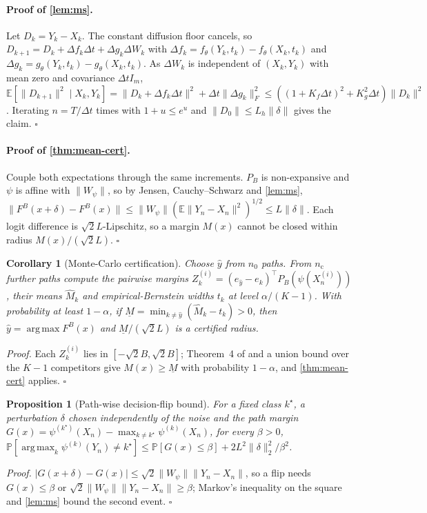 \documentclass{article}
\newtheorem{proposition}{Proposition}
\newtheorem{corollary}{Corollary}
\theoremstyle{definition}
\newcommand{\Exp}{\mathbb{E}}
\newcommand{\Prob}{\mathbb{P}}
\newcommand{\tr}{\top}
\DeclareMathOperator*{\argmax}{arg\,max}
\begin{document}
\paragraph{Proof of \cref{lem:ms}.} Let $D_k=Y_k-X_k$. The constant diffusion
floor cancels, so $D_{k+1}=D_k+\Delta f_k\Delta t+\Delta g_k\Delta W_k$ with
$\Delta f_k=f_\theta(Y_k,t_k)-f_\theta(X_k,t_k)$ and
$\Delta g_k=g_\theta(Y_k,t_k)-g_\theta(X_k,t_k)$. As $\Delta W_k$ is independent
of $(X_k,Y_k)$ with mean zero and covariance $\Delta t I_m$,
$\Exp[\|D_{k+1}\|^2\mid X_k,Y_k]=\|D_k+\Delta f_k\Delta t\|^2+\Delta t\|\Delta g_k\|_F^2
\le((1+K_f\Delta t)^2+K_g^2\Delta t)\|D_k\|^2$. Iterating $n=T/\Delta t$ times with
$1+u\le e^u$ and $\|D_0\|\le L_h\|\delta\|$ gives the claim. \hfill$\square$

\paragraph{Proof of \cref{thm:mean-cert}.} Couple both expectations through the
same increments. $P_B$ is non-expansive and $\psi$ is affine with $\|W_\psi\|$,
so by Jensen, Cauchy--Schwarz and \cref{lem:ms},
$\|F^B(x+\delta)-F^B(x)\|\le\|W_\psi\|(\Exp\|Y_n-X_n\|^2)^{1/2}\le L\|\delta\|$.
Each logit difference is $\sqrt2L$-Lipschitz, so a margin $M(x)$ cannot be closed
within radius $M(x)/(\sqrt2L)$. \hfill$\square$

\begin{corollary}[Monte-Carlo certification]\label{cor:mc}
Choose $\hat y$ from $n_0$ paths. From $n_{\mathrm c}$ further paths compute the
pairwise margins $Z^{(i)}_k=(e_{\hat y}-e_k)^\tr P_B(\psi(X^{(i)}_n))$, their
means $\hat M_k$ and empirical-Bernstein widths $t_k$ \citep{maurer2009bernstein}
at level $\alpha/(K-1)$. With probability at least $1-\alpha$, if
$\underline M=\min_{k\ne\hat y}(\hat M_k-t_k)>0$, then $\hat y=\argmax F^B(x)$ and
$\underline M/(\sqrt2L)$ is a certified radius.
\end{corollary}
\emph{Proof.} Each $Z^{(i)}_k$ lies in $[-\sqrt2B,\sqrt2B]$; Theorem~4 of
\citet{maurer2009bernstein} and a union bound over the $K-1$ competitors give
$M(x)\ge\underline M$ with probability $1-\alpha$, and \cref{thm:mean-cert}
applies. \hfill$\square$

\begin{proposition}[Path-wise decision-flip bound]\label{prop:flip}
For a fixed class $k^\star$, a perturbation $\delta$ chosen independently of the
noise and the path margin $G(x)=\psi^{(k^\star)}(X_n)-\max_{k\ne k^\star}\psi^{(k)}(X_n)$,
for every $\beta>0$,
$\Prob[\argmax_k\psi^{(k)}(Y_n)\ne k^\star]\le\Prob[G(x)\le\beta]+2L^2\|\delta\|_2^2/\beta^2$.
\end{proposition}
\emph{Proof.} $|G(x+\delta)-G(x)|\le\sqrt2\|W_\psi\|\|Y_n-X_n\|$, so a flip needs
$G(x)\le\beta$ or $\sqrt2\|W_\psi\|\|Y_n-X_n\|\ge\beta$; Markov's inequality on the
square and \cref{lem:ms} bound the second event. \hfill$\square$
\end{document}
